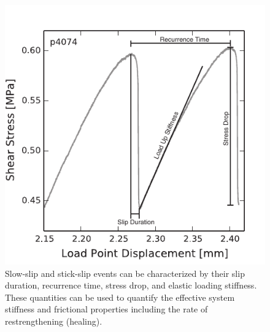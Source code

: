 \begin{figure}
\begin{center}
\includegraphics{chap_granular_stiffness/Fig4.pdf}
\caption{\label{fig:stickslip}
Slow-slip and stick-slip events can be characterized by their slip duration, recurrence time, stress drop, and elastic loading stiffness.  These quantities can be used to quantify the effective system stiffness and frictional properties including the rate of restrengthening (healing).    }
\end{center}
\end{figure}



